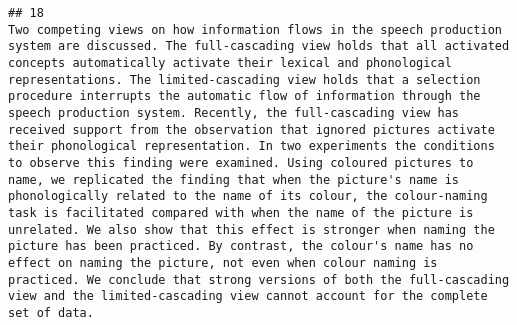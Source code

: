 \documentclass[
  english,
  man]{apa6}
\begin{document}
\begin{verbatim}
## 18                                                                                                                                                                                                                                                                                                                                                                                                                                                                                                                                                                                                                                                                                                                                                                                                                                                                                                                                                                                                                                                                                                                                                                                                                                                                                                                                                                                                                                                                           Two competing views on how information flows in the speech production system are discussed. The full-cascading view holds that all activated concepts automatically activate their lexical and phonological representations. The limited-cascading view holds that a selection procedure interrupts the automatic flow of information through the speech production system. Recently, the full-cascading view has received support from the observation that ignored pictures activate their phonological representation. In two experiments the conditions to observe this finding were examined. Using coloured pictures to name, we replicated the finding that when the picture's name is phonologically related to the name of its colour, the colour-naming task is facilitated compared with when the name of the picture is unrelated. We also show that this effect is stronger when naming the picture has been practiced. By contrast, the colour's name has no effect on naming the picture, not even when colour naming is practiced. We conclude that strong versions of both the full-cascading view and the limited-cascading view cannot account for the complete set of data.

\end{verbatim}
\end{document}
